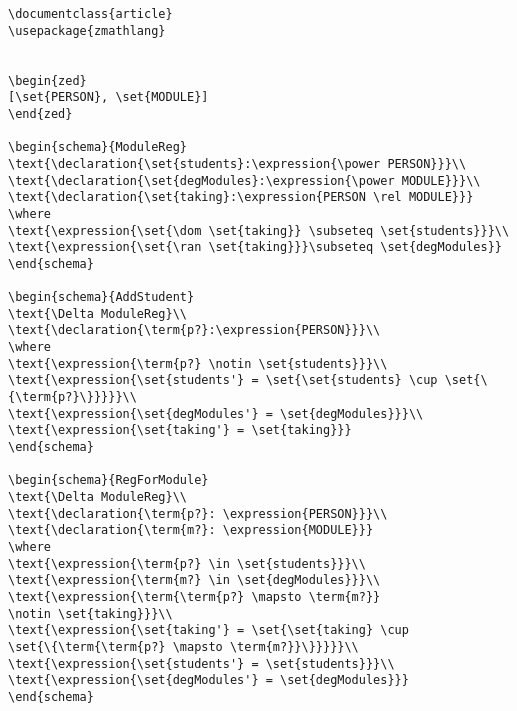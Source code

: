 \begin{verbatim}
\documentclass{article}
\usepackage{zmathlang}


\begin{zed}
[\set{PERSON}, \set{MODULE}]
\end{zed}

\begin{schema}{ModuleReg}
\text{\declaration{\set{students}:\expression{\power PERSON}}}\\
\text{\declaration{\set{degModules}:\expression{\power MODULE}}}\\
\text{\declaration{\set{taking}:\expression{PERSON \rel MODULE}}}
\where
\text{\expression{\set{\dom \set{taking}} \subseteq \set{students}}}\\
\text{\expression{\set{\ran \set{taking}}}\subseteq \set{degModules}}
\end{schema}

\begin{schema}{AddStudent}
\text{\Delta ModuleReg}\\
\text{\declaration{\term{p?}:\expression{PERSON}}}\\
\where
\text{\expression{\term{p?} \notin \set{students}}}\\
\text{\expression{\set{students'} = \set{\set{students} \cup \set{\{\term{p?}\}}}}}\\
\text{\expression{\set{degModules'} = \set{degModules}}}\\
\text{\expression{\set{taking'} = \set{taking}}}
\end{schema}

\begin{schema}{RegForModule}
\text{\Delta ModuleReg}\\
\text{\declaration{\term{p?}: \expression{PERSON}}}\\
\text{\declaration{\term{m?}: \expression{MODULE}}}
\where
\text{\expression{\term{p?} \in \set{students}}}\\
\text{\expression{\term{m?} \in \set{degModules}}}\\
\text{\expression{\term{\term{p?} \mapsto \term{m?}}
\notin \set{taking}}}\\
\text{\expression{\set{taking'} = \set{\set{taking} \cup
\set{\{\term{\term{p?} \mapsto \term{m?}}\}}}}}\\
\text{\expression{\set{students'} = \set{students}}}\\
\text{\expression{\set{degModules'} = \set{degModules}}}
\end{schema}


\end{verbatim}